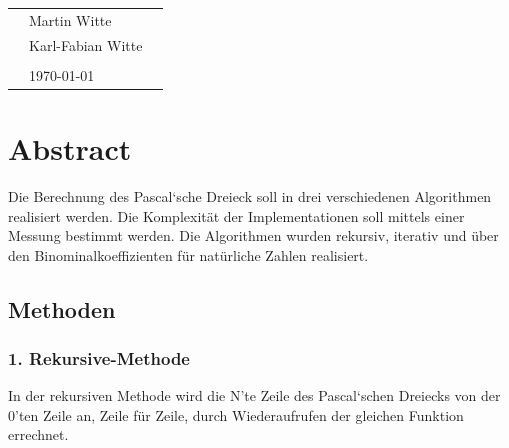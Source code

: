 \documentclass[
   draft=false
  ,paper=a4
  ,twoside=false
  ,fontsize=11pt
  ,headsepline
  ,DIV11
  ,parskip=full+
]{scrartcl} %
\begin{document}
\def\titel{AD Praktikum: Aufgabe 04, Pascals Dreieck}


\def\teilnehmer{ 
	& Martin Witte & \\
    & Karl-Fabian Witte   & \\
}




\newlength{\txtw} %
\setlength{\txtw}{\textwidth} %
\addtolength{\txtw}{-10\tabcolsep} %

\def\me{\myName \newline \footnotesize{\url{\myEmail} } }

\begin{tabular}{l p{0.4\txtw} p{0.4\txtw} }
	\teilnehmer
	& & \\
	& \today & \\
\end{tabular}

\section*{Abstract}
\centering
Die Berechnung des Pascal`sche Dreieck soll in drei verschiedenen Algorithmen realisiert werden. Die \mbox{Komplexität} der Implementationen soll mittels einer Messung bestimmt werden. Die Algorithmen wurden rekursiv, iterativ und über den Binominalkoeffizienten für natürliche Zahlen realisiert.  

\normalsize
\subsection*{Methoden}

\subsubsection*{1. Rekursive-Methode}
In der rekursiven Methode wird die N'te Zeile des Pascal`schen Dreiecks von der 0'ten Zeile an, Zeile für Zeile, durch Wiederaufrufen der gleichen Funktion errechnet.
$ $
\end{document}
